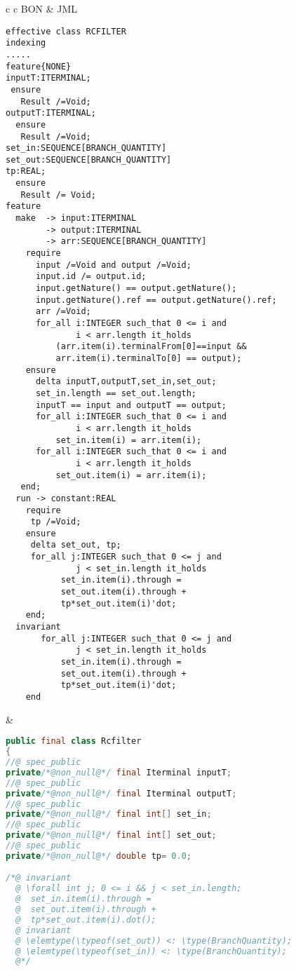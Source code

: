 \begin{figure}[H]
\begin{tabular}{ c  c }
BON & JML \\ \hline
\begin{minipage}[l]{6.4cm} 
\begin{lstlisting}[language=Bon]
effective class RCFILTER
indexing
.....
feature{NONE}
inputT:ITERMINAL;
 ensure
   Result /=Void;
outputT:ITERMINAL;
  ensure
   Result /=Void;
set_in:SEQUENCE[BRANCH_QUANTITY]
set_out:SEQUENCE[BRANCH_QUANTITY]
tp:REAL;
  ensure
   Result /= Void;
feature
  make  -> input:ITERMINAL 
        -> output:ITERMINAL
        -> arr:SEQUENCE[BRANCH_QUANTITY]
    require
      input /=Void and output /=Void;
      input.id /= output.id;
      input.getNature() == output.getNature();
      input.getNature().ref == output.getNature().ref;
      arr /=Void;
      for_all i:INTEGER such_that 0 <= i and 
              i < arr.length it_holds 
          (arr.item(i).terminalFrom[0]==input &&
          arr.item(i).terminalTo[0] == output);
    ensure
      delta inputT,outputT,set_in,set_out;
      set_in.length == set_out.length;
      inputT == input and outputT == output;
      for_all i:INTEGER such_that 0 <= i and 
              i < arr.length it_holds 
          set_in.item(i) = arr.item(i);
      for_all i:INTEGER such_that 0 <= i and 
              i < arr.length it_holds 
          set_out.item(i) = arr.item(i);
   end;
  run -> constant:REAL
    require 
     tp /=Void;
    ensure
     delta set_out, tp;  
     for_all j:INTEGER such_that 0 <= j and 
              j < set_in.length it_holds 
           set_in.item(i).through = 
           set_out.item(i).through + 
           tp*set_out.item(i)'dot;
    end;
  invariant
       for_all j:INTEGER such_that 0 <= j and 
              j < set_in.length it_holds 
           set_in.item(i).through = 
           set_out.item(i).through + 
           tp*set_out.item(i)'dot;
    end   
\end{lstlisting}
\end{minipage}  
&
\begin{minipage}[r]{6.6cm}
\begin{lstlisting}[language=Java]
public final class Rcfilter 
{
//@ spec_public
private/*@non_null@*/ final Iterminal inputT;
//@ spec_public
private/*@non_null@*/ final Iterminal outputT;
//@ spec_public
private/*@non_null@*/ final int[] set_in;
//@ spec_public
private/*@non_null@*/ final int[] set_out;
//@ spec_public
private/*@non_null@*/ double tp= 0.0;

/*@ invariant 
  @ \forall int j; 0 <= i && j < set_in.length;
  @  set_in.item(i).through = 
  @  set_out.item(i).through + 
  @  tp*set_out.item(i).dot();
  @ invariant
  @ \elemtype(\typeof(set_out)) <: \type(BranchQuantity);
  @ \elemtype(\typeof(set_in)) <: \type(BranchQuantity);
  @*/


\end{lstlisting}
\end{minipage}
\end{tabular}
\end{figure}
